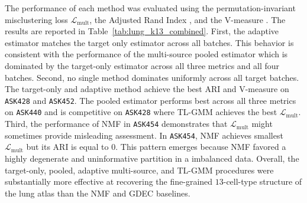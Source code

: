 \documentclass[10pt]{article}
\begin{document}
The performance of each method was evaluated using the permutation-invariant misclustering loss $\mathcal L_{\mathrm{mult}}$, the Adjusted Rand Index \citep{hubert1985comparing}, and the V-measure \citep{rosenberg-hirschberg-2007-v}. The results are reported in Table~\ref{tab:lung_k13_combined}. First, the adaptive estimator matches the target only estimator across all batches. This behavior is consistent with the performance of the multi-source pooled estimator which is dominated by the target-only estimator across all three metrics and all four batches.
Second, no single method dominates uniformly across all target batches. The target-only and adaptive method achieve the best ARI and V-measure on \texttt{ASK428} and \texttt{ASK452}.
The pooled estimator performs best across all three metrics on
\texttt{ASK440} and is competitive on \texttt{ASK428} where TL-GMM achieves the best $\mathcal L_{\mathrm{mult}}$.
Third, the performance of NMF in \texttt{ASK454} demonstrates that $\mathcal L_{\mathrm{mult}}$ might sometimes provide misleading assessment. In \texttt{ASK454}, NMF achieves smallest $\mathcal L_{\mathrm{mult}}$ but its ARI is equal to 0. This pattern emerges because NMF favored a highly degenerate and uninformative partition in a imbalanced data. Overall, the target-only, pooled, adaptive multi-source, and TL-GMM procedures were substantially more effective at recovering the fine-grained $13$-cell-type structure of the lung atlas than the NMF and GDEC baselines.
\end{document}
